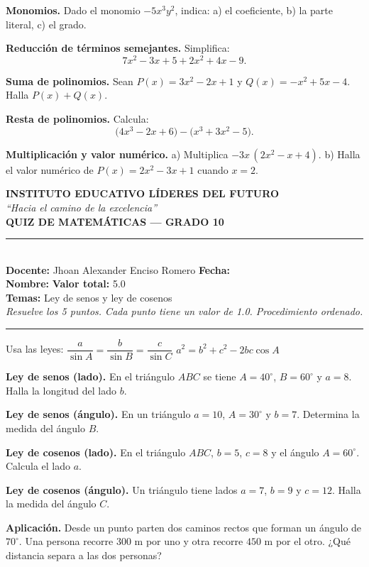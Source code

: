 \documentclass[11pt]{article}
\newcommand{\linea}[1]{\underline{\hspace{#1}}}
\newcommand{\encabezadoquiz}[2]{%
  \begin{center}
    {\large\bfseries INSTITUTO EDUCATIVO LÍDERES DEL FUTURO}\\[2pt]
    {\itshape\small ``Hacia el camino de la excelencia''}\\[5pt]
    {\Large\bfseries QUIZ DE MATEMÁTICAS --- GRADO #1}
  \end{center}
  \vspace{2pt}
  \noindent\rule{\textwidth}{0.8pt}\\[6pt]
  \noindent\textbf{Docente:} Jhoan Alexander Enciso Romero \hfill \textbf{Fecha:} \linea{3.2cm}\\[8pt]
  \noindent\textbf{Nombre:} \linea{9cm} \hfill \textbf{Valor total:} 5.0\\[6pt]
  \noindent\textbf{Temas:} #2\\[2pt]
  \noindent\textit{\small Resuelve los 5 puntos. Cada punto tiene un valor de 1.0. Procedimiento ordenado.}
  \par\vspace{4pt}\noindent\rule{\textwidth}{0.4pt}\par\vspace{8pt}
}
\begin{document}
\begin{puntos}
  \item \textbf{Monomios.} Dado el monomio $-5x^{3}y^{2}$, indica:
        a) el coeficiente, \quad b) la parte literal, \quad c) el grado.

  \item \textbf{Reducción de términos semejantes.} Simplifica:
        \[ 7x^{2} - 3x + 5 + 2x^{2} + 4x - 9. \]

  \item \textbf{Suma de polinomios.} Sean $P(x)=3x^{2}-2x+1$ y $Q(x)=-x^{2}+5x-4$.
        Halla $P(x)+Q(x)$.

  \item \textbf{Resta de polinomios.} Calcula:
        \[ \bigl(4x^{3}-2x+6\bigr) - \bigl(x^{3}+3x^{2}-5\bigr). \]

  \item \textbf{Multiplicación y valor numérico.}
        a) Multiplica $-3x\,(2x^{2}-x+4)$. \quad
        b) Halla el valor numérico de $P(x)=2x^{2}-3x+1$ cuando $x=2$.
\end{puntos}

\newpage

\encabezadoquiz{10\textdegree}{Ley de senos y ley de cosenos}

\begin{center}\small Usa las leyes:\quad
$\dfrac{a}{\sin A}=\dfrac{b}{\sin B}=\dfrac{c}{\sin C}$ \qquad\qquad
$a^{2}=b^{2}+c^{2}-2bc\cos A$
\end{center}
\vspace{4pt}

\begin{puntos}
  \item \textbf{Ley de senos (lado).} En el triángulo $ABC$ se tiene $A=40^{\circ}$, $B=60^{\circ}$ y $a=8$.
        Halla la longitud del lado $b$.

  \item \textbf{Ley de senos (ángulo).} En un triángulo $a=10$, $A=30^{\circ}$ y $b=7$.
        Determina la medida del ángulo $B$.

  \item \textbf{Ley de cosenos (lado).} En el triángulo $ABC$, $b=5$, $c=8$ y el ángulo $A=60^{\circ}$.
        Calcula el lado $a$.

  \item \textbf{Ley de cosenos (ángulo).} Un triángulo tiene lados $a=7$, $b=9$ y $c=12$.
        Halla la medida del ángulo $C$.

  \item \textbf{Aplicación.} Desde un punto parten dos caminos rectos que forman un ángulo de $70^{\circ}$.
        Una persona recorre $300$ m por uno y otra recorre $450$ m por el otro.
        ¿Qué distancia separa a las dos personas?
\end{puntos}
\end{document}
